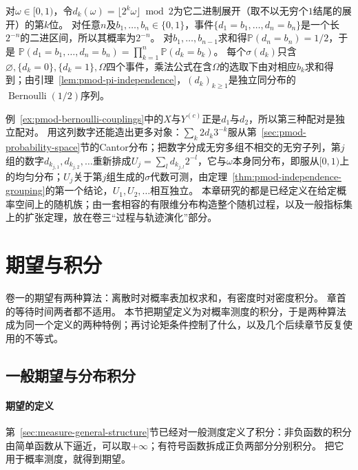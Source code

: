 \begin{example}[二进制数字是独立的公平比特]
\label{ex:pmod-binary-digits}
对$\omega\in[0,1)$，令$d_k(\omega)=\lfloor2^k\omega\rfloor\bmod2$为它二进制展开（取不以无穷个$1$结尾的展开）的第$k$位。
对任意$n$及$b_1,\dots,b_n\in\{0,1\}$，事件$\{d_1=b_1,\dots,d_n=b_n\}$是一个长$2^{-n}$的二进区间，所以其概率为$2^{-n}$。
对$b_1,\dots,b_{n-1}$求和得$\mathbb P(d_n=b_n)=1/2$，于是
$\mathbb P(d_1=b_1,\dots,d_n=b_n)=\prod_{k=1}^n\mathbb P(d_k=b_k)$。
每个$\sigma(d_k)$只含$\varnothing,\{d_k=0\},\{d_k=1\},\Omega$四个事件，乘法公式在含$\Omega$的选取下由对相应$b_k$求和得到；由引理~\ref{lem:pmod-pi-independence}，$(d_k)_{k\ge1}$是独立同分布的$\operatorname{Bernoulli}(1/2)$序列。
\end{example}

例~\ref{ex:pmod-bernoulli-couplings}中的$X$与$Y^{(c)}$正是$d_1$与$d_2$，所以第三种配对是独立配对。
用这列数字还能造出更多对象：$\sum_k2d_k3^{-k}$服从第~\ref{sec:pmod-probability-space}节的Cantor分布；把数字分成无穷多组不相交的无穷子列，第$j$组的数字$d_{k_{j,1}},d_{k_{j,2}},\dots$重新排成$U_j=\sum_l d_{k_{j,l}}2^{-l}$，它与$\omega$本身同分布，即服从$[0,1)$上的均匀分布；$U_j$关于第$j$组生成的$\sigma$代数可测，由定理~\ref{thm:pmod-independence-grouping}的第一个结论，$U_1,U_2,\dots$相互独立。
本章研究的都是已经定义在给定概率空间上的随机族；由一套相容的有限维分布构造整个随机过程，以及一般指标集上的扩张定理，放在卷三“过程与轨迹演化”部分。

\section{期望与积分}
\label{sec:pmod-expectation}

卷一的期望有两种算法：离散时对概率表加权求和，有密度时对密度积分。
章首的等待时间两者都不适用。
本节把期望定义为对概率测度的积分，于是两种算法成为同一个定义的两种特例；再讨论矩条件控制了什么，以及几个后续章节反复使用的不等式。

\subsection{一般期望与分布积分}

\paragraph{期望的定义}
第~\ref{sec:measure-general-structure}节已经对一般测度定义了积分：非负函数的积分由简单函数从下逼近，可以取$+\infty$；有符号函数拆成正负两部分分别积分。
把它用于概率测度，就得到期望。


